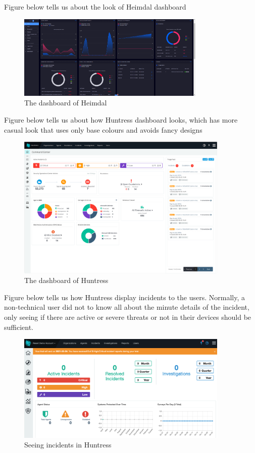 Figure below tells us about the look of Heimdal dashboard

\begin{figure}[H]
      \centering
      \includegraphics[width=0.8\textwidth]{Figures/Heimdal/Home.png}
      \caption{The dashboard of Heimdal\textregistered{}}
\end{figure}

Figure below tells us about how Huntress dashboard looks, which has more casual look that uses only base colours and avoids fancy designs

\begin{figure}[H]
      \centering
      \includegraphics[width=0.9\textwidth]{Figures/Huntress/dashboard.png}
      \caption{The dashboard of Huntress}
\end{figure}

Figure below tells us how Huntress display incidents to the users. Normally, a non-technical user did not to know all about the minute details
of the incident, only seeing if there are active or severe threats or not in their devices should be sufficient.

\begin{figure}[H]
      \centering
      \includegraphics[width=0.9\textwidth]{Figures/Huntress/incidents.png}
      \caption{Seeing incidents in Huntress}
\end{figure}

